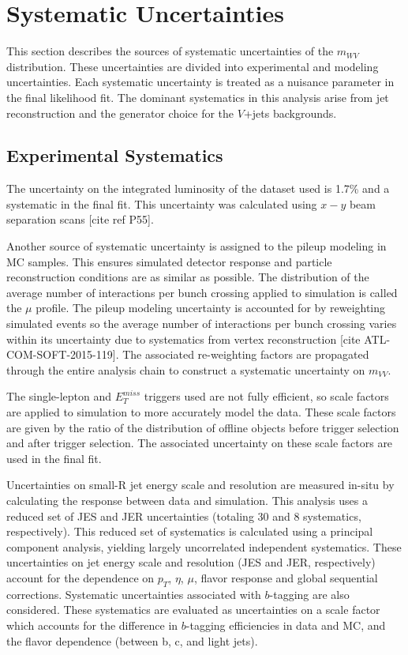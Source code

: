 \chapter{Systematic Uncertainties}
This section describes the sources of systematic uncertainties of the $m_{WV}$ distribution. These uncertainties are divided into experimental and modeling uncertainties. Each systematic uncertainty is treated as a nuisance parameter in the final likelihood fit. The dominant systematics in this analysis arise from jet reconstruction and the generator choice for the $V$+jets backgrounds.

\section{Experimental Systematics}
The uncertainty on the integrated luminosity of the dataset used is 1.7\% and a systematic in the final fit. This uncertainty was calculated using $x-y$ beam separation scans [cite ref P55]. 

Another source of systematic uncertainty is assigned to the pileup modeling in MC samples. This ensures simulated detector response and particle reconstruction conditions are as similar as possible. The distribution of the average number of interactions per bunch crossing applied to simulation is called the $\mu$ profile. The pileup modeling uncertainty is accounted for by reweighting simulated events so the average number of interactions per bunch crossing varies within its uncertainty due to systematics from vertex reconstruction [cite ATL-COM-SOFT-2015-119]. The associated re-weighting factors are propagated through the entire analysis chain to construct a systematic uncertainty on $m_{VV}$.

The single-lepton and $E_{T}^{miss}$ triggers used are not fully efficient, so scale factors are applied to simulation to more accurately model the data. These scale factors are given by the ratio of the distribution of offline objects before trigger selection and after trigger selection. The associated uncertainty on these scale factors are used in the final fit.

Uncertainties on small-R jet energy scale and resolution are measured in-situ by calculating the response between data and simulation. This analysis uses a reduced set of JES and JER uncertainties (totaling 30 and 8 systematics, respectively). This reduced set of systematics is calculated using a principal component analysis, yielding largely uncorrelated independent systematics. These uncertainties on jet energy scale and resolution (JES and JER, respectively) account for the dependence on $p_{T}$, $\eta$, $\mu$, flavor response and global sequential corrections. Systematic uncertainties associated with $b$-tagging are also considered. These systematics are evaluated as uncertainties on a scale factor which accounts for the difference in $b$-tagging efficiencies in data and MC, and the flavor dependence (between b, c, and light jets). 

